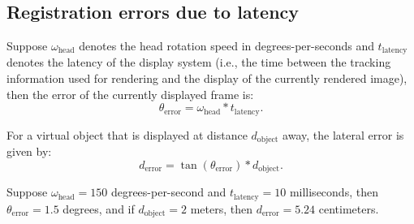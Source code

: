 \chapter[]{}
\section[]{Registration errors due to latency}
\label{sec:appendix:registration_errors_latency}

Suppose $\omega_{\text{head}}$ denotes the head rotation speed in degrees-per-seconds and $t_{\text{latency}}$ denotes the latency of the display system (i.e., the time between the tracking information used for rendering and the display of the currently rendered image), then the error of the currently displayed frame is:
\begin{equation}
    \theta_{\text{error}} = \omega_{\text{head}} \ast t_{\text{latency}}.
\end{equation}

For a virtual object that is displayed at distance $d_{\text{object}}$ away, the lateral error is given by:
\begin{equation}
    d_{\text{error}} = \tan(\theta_{\text{error}}) \ast d_{\text{object}}.
\end{equation}

Suppose $\omega_{\text{head}} = 150$ degrees-per-second and $t_{\text{latency}} = 10$ milliseconds, then $\theta_{\text{error}}=1.5$ degrees, and if $d_{\text{object}}=2$ meters, then $d_{\text{error}}=5.24$ centimeters.

